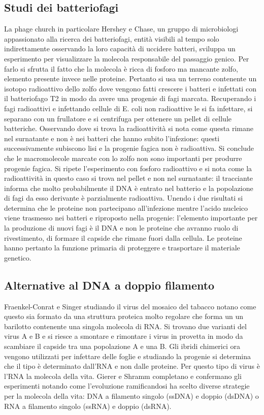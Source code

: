 \subsection{Studi dei batteriofagi}
La phage church in particolare Hershey e Chase, un gruppo di microbiologi appassionato alla ricerca dei batteriofagi, entit\`a visibili al tempo solo indirettamente osservando la loro 
capacit\`a di uccidere batteri, sviluppa un esperimento per visualizzare la molecola responsabile del passaggio genico. Per farlo si sfrutta il fatto che la molecola \`e ricca di 
fosforo ma mancante zolfo, elemento presente invece nelle proteine. Pertanto si usa un terreno contenente un isotopo radioattivo dello zolfo dove vengono fatti crescere i batteri e 
infettati con il batteriofago T2 in modo da avere una progenie di fagi marcata. Recuperando i fagi radioattivi e infettando cellule di E. coli non radioattive le si fa infettare, si 
separano con un frullatore e si centrifuga per ottenere un pellet di cellule batteriche. Osservando dove si trova la radioattivit\`a si nota come questa rimane nel surnatante e non \`e 
nei batteri che hanno subito l'infezione: questi successivamente subiscono lisi e la progenie fagica non \`e radioattiva. Si conclude che le macromolecole marcate con lo zolfo non sono 
importanti per produrre progenie fagica. Si ripete l'esperimento con fosforo radioattivo e si nota come la radioattivit\`a in questo caso si trova nel pellet e non nel surnatante: il 
tracciante informa che molto probabilmente il DNA \`e entrato nel batterio e la popolazione di fagi da esso derivante \`e parzialmente radioattiva. Unendo i due risultati si determina 
che le proteine non partecipano all'infezione mentre l'acido nucleico viene trasmesso nei batteri e riproposto nella progenie: l'elemento importante per la produzione di nuovi fagi \`e 
il DNA e non le proteine che avranno ruolo di rivestimento, di formare il capside che rimane fuori dalla cellula. Le proteine hanno pertanto la funzione primaria di proteggere e 
trasportare il materiale genetico. 
\subsection{Alternative al DNA a doppio filamento}
Fraenkel-Conrat e Singer studiando il virus del mosaico del tabacco notano come questo sia formato da una struttura proteica molto regolare che forma un un barilotto contenente una 
singola molecola di RNA. Si trovano due varianti del virus A e B e si riesce a smontare e rimontare i virus in provetta in modo da scambiare il capside tra una popolazione A e una B. 
Gli ibridi chimerici ora vengono utilizzati per infettare delle foglie e studiando la progenie si determina che il tipo \`e determinato dall'RNA e non dalle proteine. Per questo tipo 
di virus \`e l'RNA la molecola della vita. Gierer e Shramm completano e confermano gli esperimenti notando come l'evoluzione ramificandosi ha scelto diverse strategie per la molecola
della vita: DNA a filamento singolo (ssDNA) e doppio (dsDNA) o RNA a filamento singolo (ssRNA) e doppio (dsRNA). 




